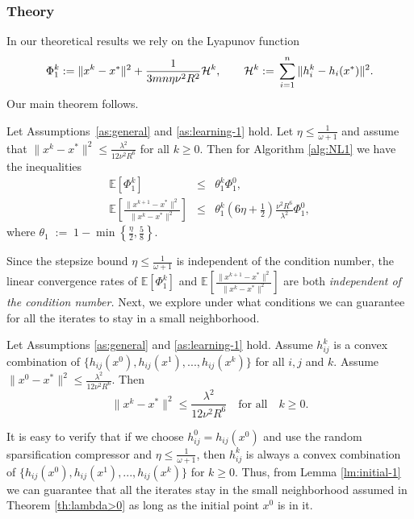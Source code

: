 \documentclass[12pt]{article}
\newcommand{\squeeze}{}
\newcommand{\eqdef}{\; { := }\;}
\newcommand{\newalpha}{h}
\begin{document}
\subsubsection{Theory}

In our theoretical results we rely on the Lyapunov function 
$$
\squeeze \Phi_1^k \eqdef \|x^{k} - x^*\|^2 + \frac{1}{3mn\eta  \nu^2 R^2} {\cal H}^{k}, \qquad {\cal H}^k \eqdef \sum_{i=1}^n \|h_i^k - \newalpha_i(x^*)\|^2. 
$$ Our main theorem follows.

\begin{theorem}[Convergence of {\sf NL}]\label{th:lambda>0}
Let  Assumptions~\ref{as:general} and  \ref{as:learning-1} hold. Let $\eta\leq \frac{1}{\omega+1}$ and assume that $\|x^k - x^*\|^2 \leq \frac{\lambda^2}{12\nu^2R^6}$ for all $k\geq 0$. Then for Algorithm \ref{alg:NL1} we have the inequalities 
\begin{eqnarray*}
\squeeze
\mathbb{E}[\Phi_1^k] & \leq & \theta_1^k \Phi_1^0,\\
\squeeze  
\mathbb{E} \left[  \frac{\|x^{k+1} - x^*\|^2}{\|x^k - x^*\|^2 }  \right] & \leq &\theta_1^k  \left(  {6\eta} + \frac{1}{2}  \right) \frac{\nu^2 R^6}{\lambda^2} \Phi_1^0, 
\end{eqnarray*}
where $\theta_1 \eqdef    1 - \min \left\{  \frac{\eta}{2}, \frac{5}{8}  \right\} $.
\end{theorem}


Since the stepsize bound $\eta \leq \frac{1}{\omega+1}$ is independent of the condition number, the linear convergence rates of $\mathbb{E}[\Phi_1^k]$ and $ \mathbb{E} \left[  \frac{\|x^{k+1} - x^*\|^2}{\|x^k - x^*\|^2 }  \right]$ are both {\em independent of the condition number.} Next, we explore under what conditions we can guarantee for all the iterates to stay in a small neighborhood. 

\begin{lemma}\label{lm:initial-1}
Let Assumptions \ref{as:general} and \ref{as:learning-1} hold. Assume $h_{ij}^k$ is a convex combination of $\{  \newalpha_{ij}(x^0), \newalpha_{ij}(x^1), ..., \newalpha_{ij}(x^k)  \}$ for all $i,j$ and $k$. Assume $\|x^0 - x^*\|^2 \leq \frac{\lambda^2}{12\nu^2R^6}$. Then $$
\|x^k - x^*\|^2 \leq \frac{\lambda^2}{12\nu^2R^6} \quad \text{for all} \quad k\geq 0.
$$ 
\end{lemma}


It is easy to verify that if we choose $h_{ij}^0 = \newalpha_{ij}(x^0)$ and use the random sparsification compressor and $\eta \leq \frac{1}{\omega + 1}$, then $h_{ij}^k$ is always a convex combination of $\{  \newalpha_{ij}(x^0), \newalpha_{ij}(x^1), ..., \newalpha_{ij}(x^k)  \}$ for $k\geq 0$. Thus, from Lemma \ref{lm:initial-1} we can guarantee that all the iterates stay in the small neighborhood assumed in Theorem \ref{th:lambda>0} as long as the initial point $x^0$ is in it.  
\end{document}
